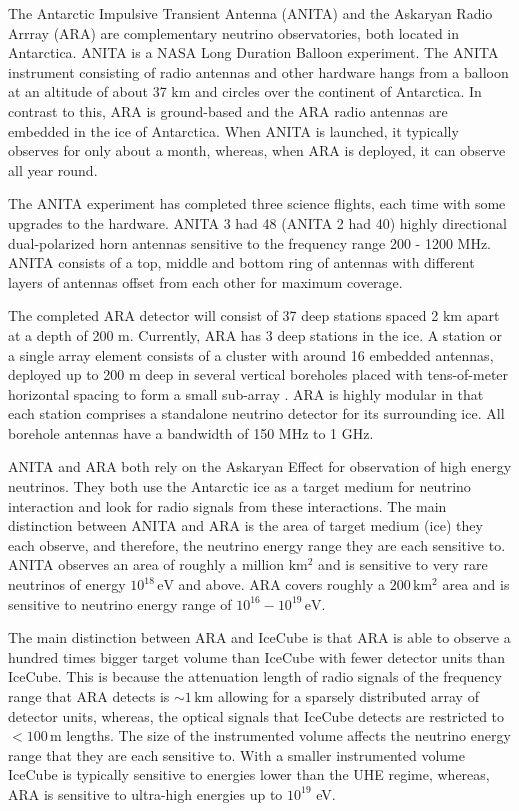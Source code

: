 \documentclass[12pt]{article}
\begin{document}
\begin{doublespace}
The Antarctic Impulsive Transient Antenna (ANITA) and the Askaryan Radio Arrray (ARA) are complementary neutrino observatories, both located in Antarctica. ANITA is a NASA Long Duration Balloon experiment. The ANITA instrument consisting of radio antennas and other hardware hangs from a balloon at an altitude of about 37 km and circles over the continent of Antarctica. In contrast to this, ARA is ground-based and the ARA radio antennas are embedded in the ice of Antarctica. When ANITA is launched, it typically observes for only about a month, whereas, when ARA is deployed, it can observe all year round.\par
The ANITA experiment has completed three science flights, each time with some upgrades to the hardware. ANITA 3 had 48 (ANITA 2 had 40) highly directional dual-polarized horn antennas sensitive to the frequency range 200 - 1200 MHz. ANITA consists of a top, middle and bottom ring of antennas with different layers of antennas offset from each other for maximum coverage.\par
The completed ARA detector will consist of 37 deep stations spaced 2 km apart at a depth of 200 m. Currently, ARA has 3 deep stations in the ice. A station or a single array element consists of a cluster with around 16 embedded antennas, deployed up to 200 m deep in several vertical boreholes placed with tens-of-meter horizontal spacing to form a small sub-array \cite{arahardware}. ARA is highly modular in that each station comprises a standalone neutrino detector for its surrounding ice. All borehole antennas have a bandwidth of 150 MHz to 1 GHz. \par
ANITA and ARA both rely on the Askaryan Effect \cite{Askaryan} for observation of high energy neutrinos. They both use the Antarctic ice as a target medium for neutrino interaction and look for radio signals from these interactions. The main distinction between ANITA and ARA is the area of target medium (ice) they each observe, and therefore, the neutrino energy range they are each sensitive to. ANITA observes an area of roughly a million $\mathrm{km^2}$ and is sensitive to very rare neutrinos of energy $10^{18} \, \mathrm{eV}$ and above. ARA covers roughly a $200 \, \mathrm{km^2}$ area and is sensitive to neutrino energy range of $10^{16} - 10^{19}\, \mathrm{eV}$. \par
The main distinction between ARA and IceCube is that ARA is able to observe a hundred times bigger target volume than IceCube with fewer detector units than IceCube. This is because the attenuation length of radio signals of the frequency range that ARA detects is $\sim 1 \, \mathrm{km}$ allowing for a sparsely distributed array of detector units, whereas, the optical signals that IceCube detects are restricted to $< 100 \, \mathrm{m}$ lengths. The size of the instrumented volume affects the neutrino energy range that they are each sensitive to. With a smaller instrumented volume IceCube is typically sensitive to energies lower than the UHE regime, whereas, ARA is sensitive to ultra-high energies up to $10^{19}$ eV. 


\end{doublespace}
\end{document}
